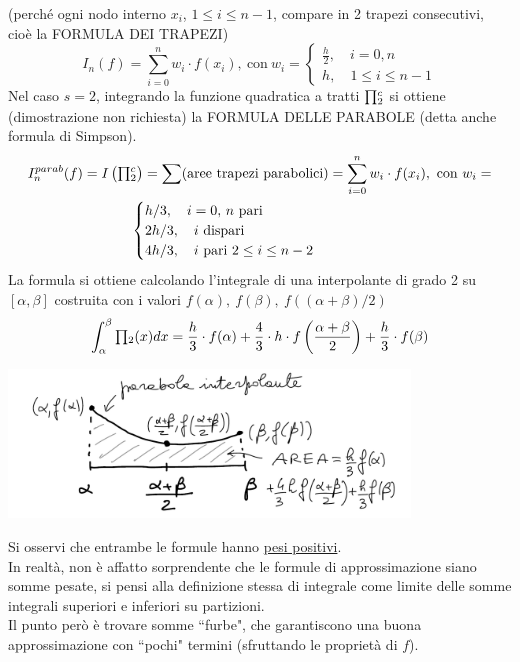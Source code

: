 (perché ogni nodo interno $x_i$, $1 \leq i \leq n-1$, compare in 2 trapezi consecutivi, cioè la FORMULA DEI TRAPEZI)
\[
I_n (f) = \sum_{i=0}^n w_i \cdot f(x_i), \ \text{con} \ w_i =
\begin{cases}
\frac{h}{2}, \quad i=0,n \\
h, \quad 1 \le i \le n-1
\end{cases}
\]
Nel caso $s=2$, integrando la funzione quadratica a tratti $\begin{matrix}\prod\end{matrix}_2^c$ si ottiene (dimostrazione non richiesta) la FORMULA DELLE PARABOLE (detta anche formula di Simpson).
\[
\begin{split}
I_n^{parab} (f) = I \left(\begin{matrix}\prod\end{matrix}_2^c\right) = \sum (\text{aree trapezi parabolici}) 
& = \sum_{i=0}^n w_i \cdot f(x_i), \ \text{con} \ w_i = \\
\begin{cases}
h/3,  \quad i=0, \, n \text { pari}\\
2h/3, \quad i \ \text{dispari}\\
4h/3, \quad i \ \text{pari} \ 2 \leq i \leq n-2
\end{cases}
\end{split}
\]
La formula si ottiene calcolando l'integrale di una interpolante di grado 2 su $[\alpha, \beta]$ costruita con i valori $f(\alpha), \ f(\beta), \ f((\alpha+\beta)/2)$
\[
\int_\alpha^\beta \begin{matrix}\prod\end{matrix}_2 (x) dx = \frac{h}{3} \cdot f(\alpha) + \frac{4}{3} \cdot h \cdot f\left(\frac{\alpha + \beta}{2}\right) + \frac{h}{3} \cdot f(\beta)
\]
\begin{center}
    \includegraphics[width=0.8\textwidth]{foto/pag21}
\end{center}
Si osservi che entrambe le formule hanno \uline{pesi positivi}.\\
In realtà, non è affatto sorprendente che le formule di approssimazione siano somme pesate, si pensi alla definizione stessa di integrale come limite delle somme integrali superiori e inferiori su partizioni.\\
Il punto però è trovare somme ``furbe", che garantiscono una buona approssimazione con ``pochi" termini (sfruttando le proprietà di $f$).

